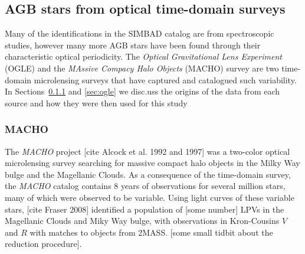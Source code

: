 \subsection{AGB stars from optical time-domain surveys}
Many of the identifications in the SIMBAD catalog are from spectroscopic studies, however many more AGB stars have been found through their characteristic optical periodicity. The \emph{Optical Gravitational Lens Experiment} (OGLE) and the \emph{MAssive Compacy Halo Objects} (MACHO) survey are two time-domain microlensing surveys that have captured and catalogued such variability. In Sections~\ref{sec:macho} and \ref{sec:ogle} we disc.uss the origins of the data from each source and how they were then used for this study

\subsubsection{MACHO}\label{sec:macho}
The \emph{MACHO} project {\color{red} [cite Alcock et al. 1992 and 1997]} was a two-color optical microlensing survey searching for massive compact halo objects in the Milky Way bulge and the Magellanic Clouds. As a consequence of the time-domain survey, the \emph{MACHO} catalog contains 8 years of observations for several million stars, many of which were observed to be variable. 
Using light curves of these variable stars, {\color{red}[cite Fraser 2008]} identified a population of {\color{red}[some number]} LPVs in the Magellanic Clouds and Miky Way bulge, with observations in Kron-Cousins $V$ and $R$ with matches to objects from 2MASS. {\color{red}[some small tidbit about the reduction procedure]}.


